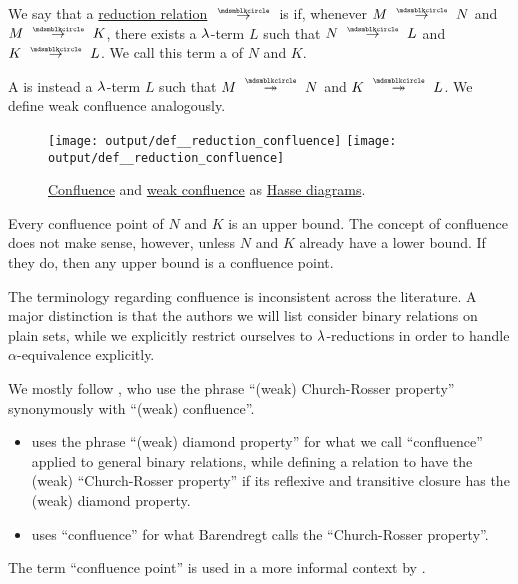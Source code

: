 \begin{definition}\label{def:reduction_confluence}
  We say that a \hyperref[def:lambda_reduction]{reduction relation} \( {\pred} \) is  if, whenever \( M \pred N \) and \( M \pred K \), there exists a \( \mathrm{\lambda} \)-term \( L \) such that \( N \pred L \) and \( K \pred L \). We call this term a   of \( N \) and \( K \).

  A  is instead a \( \mathrm{\lambda} \)-term \( L \) such that \( M \pred* N \) and \( K \pred* L \). We define weak confluence analogously.

  \begin{figure}[!ht]
    \hfill
    \texttt{[image: output/def\_\_reduction\_confluence]}
    \hfill
    \texttt{[image: output/def\_\_reduction\_confluence]}
    \hfill
    \hfill
    \caption{\hyperref[def:reduction_confluence]{Confluence} and \hyperref[def:reduction_confluence]{weak confluence} as \hyperref[def:hasse_diagram]{Hasse diagrams}.}\label{fig:def:relation_confluence}
  \end{figure}
\end{definition}
\begin{comments}
  \item Every confluence point of \( N \) and \( K \) is an upper bound. The concept of confluence does not make sense, however, unless \( N \) and \( K \) already have a lower bound. If they do, then any upper bound is a confluence point.

  \item The terminology regarding confluence is inconsistent across the literature. A major distinction is that the authors we will list consider binary relations on plain sets, while we explicitly restrict ourselves to \( \mathrm{\lambda} \)-reductions in order to handle \( \alpha \)-equivalence explicitly.

  We mostly follow , who use the phrase \enquote{(weak) Church-Rosser property} synonymously with \enquote{(weak) confluence}.
  \begin{itemize}
    \item {} uses the phrase \enquote{(weak) diamond property} for what we call \enquote{confluence} applied to general binary relations, while defining a relation to have the (weak) \enquote{Church-Rosser property} if its reflexive and transitive closure has the (weak) diamond property.

    \item {} uses \enquote{confluence} for what Barendregt calls the \enquote{Church-Rosser property}.
  \end{itemize}

  The term \enquote{confluence point} is used in a more informal context by .
\end{comments}


